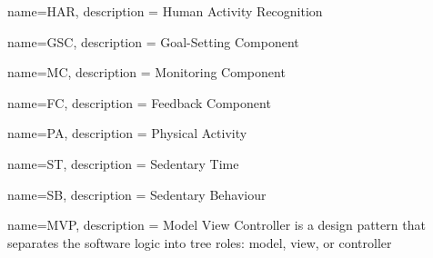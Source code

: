 
{
  name=HAR,
  description = {Human Activity Recognition}
}

{
    name=GSC,
    description = {Goal-Setting Component}
}

{
    name=MC,
    description = {Monitoring Component}
}

{
    name=FC,
    description = {Feedback Component}
}

{
    name=PA,
    description = {Physical Activity}
}

{
    name=ST,
    description = {Sedentary Time}
}

{
    name=SB,
    description = {Sedentary Behaviour}
}

{
    name=MVP,
    description = {Model View Controller is a design pattern that separates the software logic into tree roles: model, view, or controller}
}

\glsaddall %
\printglossaries